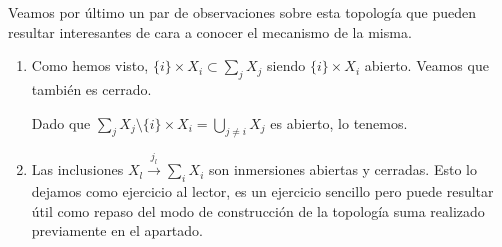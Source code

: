 \begin{obs}
	Veamos por último un par de observaciones sobre esta topología que pueden resultar interesantes de cara a conocer el mecanismo de la misma.
	\begin{enumerate}
	\item Como hemos visto, $\{i\}\times X_i\subset\sum_j X_j$ siendo $\{i\}\times X_i$ abierto. Veamos que también es cerrado.
	
	Dado que $\sum_j X_j\setminus \{i\}\times X_i=\bigcup_{j\ne i }X_j$ es abierto, lo tenemos.
	
	\item Las inclusiones $X_l\stackrel{j_l}\longrightarrow\sum_iX_i$ son inmersiones abiertas y cerradas. Esto lo dejamos como ejercicio al lector, es un ejercicio sencillo pero puede resultar útil como repaso del modo de construcción de la topología suma realizado previamente en el apartado. \qedhere
\end{enumerate}
\end{obs}
